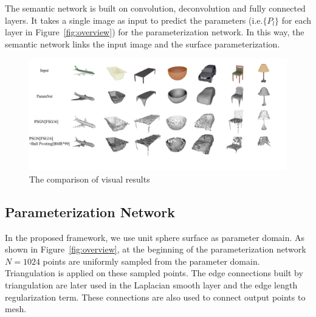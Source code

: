 The semantic network is built on convolution, deconvolution and fully connected layers. It takes a single image as input to predict the parameters (i.e.$\{P_l\}$ for each layer in Figure~\ref{fig:overview}) for the parameterization network. 
In this way, the semantic network links the input image and the surface parameterization.


\begin{figure}[htbp]
	\centering
	\includegraphics[width=\linewidth]{img/res/res}
	\caption{The comparison of visual results}
	\label{fig:res}
\end{figure}

\subsection{Parameterization Network}
In the proposed framework, we use unit sphere surface as parameter domain. 
As shown in Figure~\ref{fig:overview}, at the beginning of the parameterization network $N=1024$ points are uniformly sampled from the parameter domain. Triangulation is applied on these sampled points. 
The edge connections built by triangulation are later used in the Laplacian smooth layer and the edge length regularization term. 
These connections are also used to connect output points to mesh.
 


